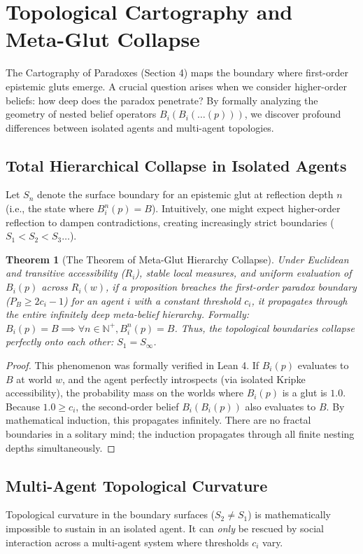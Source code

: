 \documentclass[11pt,a4paper]{article}
\newtheorem{theorem}{Theorem}[section]
\begin{document}
\section{Topological Cartography and Meta-Glut Collapse}
\label{sec:topological_cartography}

The Cartography of Paradoxes (Section 4) maps the boundary where first-order epistemic gluts emerge. A crucial question arises when we consider higher-order beliefs: how deep does the paradox penetrate? By formally analyzing the geometry of nested belief operators $B_i(B_i(\ldots(p)))$, we discover profound differences between isolated agents and multi-agent topologies.

\subsection{Total Hierarchical Collapse in Isolated Agents}
Let $S_n$ denote the surface boundary for an epistemic glut at reflection depth $n$ (i.e., the state where $B_i^n(p) = B$). Intuitively, one might expect higher-order reflection to dampen contradictions, creating increasingly strict boundaries ($S_1 < S_2 < S_3 \dots$).

\begin{theorem}[The Theorem of Meta-Glut Hierarchy Collapse]
Under Euclidean and transitive accessibility ($R_i$), stable local measures, and uniform evaluation of $B_i(p)$ across $R_i(w)$, if a proposition breaches the first-order paradox boundary ($P_B \ge 2c_i - 1$) for an agent $i$ with a constant threshold $c_i$, it propagates through the entire infinitely deep meta-belief hierarchy. Formally:
$B_i(p) = B \implies \forall n \in \mathbb{N}^+, B_i^n(p) = B$.
Thus, the topological boundaries collapse perfectly onto each other: $S_1 = S_\infty$.
\end{theorem}
\begin{proof}
This phenomenon was formally verified in Lean 4. If $B_i(p)$ evaluates to $B$ at world $w$, and the agent perfectly introspects (via isolated Kripke accessibility), the probability mass on the worlds where $B_i(p)$ is a glut is $1.0$. Because $1.0 \ge c_i$, the second-order belief $B_i(B_i(p))$ also evaluates to $B$. By mathematical induction, this propagates infinitely. There are no fractal boundaries in a solitary mind; the induction propagates through all finite nesting depths simultaneously.
\end{proof}

\subsection{Multi-Agent Topological Curvature}
Topological curvature in the boundary surfaces ($S_2 \neq S_1$) is mathematically impossible to sustain in an isolated agent. It can \textit{only} be rescued by social interaction across a multi-agent system where thresholds $c_i$ vary.
\end{document}
